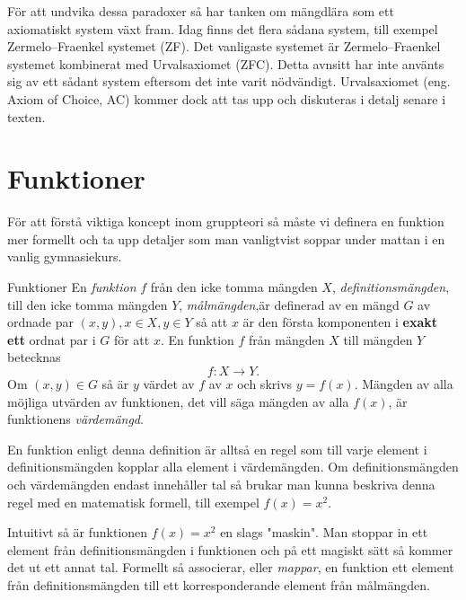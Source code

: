 \documentclass{article}
\theoremstyle{definition}
\begin{document}
För att undvika dessa paradoxer så har tanken om mängdlära som ett axiomatiskt system växt fram. 
Idag finns det flera sådana system, till exempel Zermelo–Fraenkel systemet (ZF). Det vanligaste 
systemet är Zermelo–Fraenkel systemet kombinerat med Urvalsaxiomet (ZFC). Detta avnsitt har inte använts sig 
av ett sådant system eftersom det inte varit nödvändigt. 
Urvalsaxiomet (eng. Axiom of Choice, AC) kommer dock att 
tas upp och diskuteras i detalj senare i texten.

\section{Funktioner}
För att förstå viktiga koncept inom gruppteori så måste vi definera en funktion mer formellt och ta upp detaljer som man vanligtvist soppar under mattan i en vanlig gymnasiekurs.

\begin{mydef}{Funktioner}{}
  En \textit{funktion} $f$ från den icke tomma mängden $X$, \textit{definitionsmängden}, till den icke tomma mängden $Y$, \textit{målmängden},är definerad 
  av en mängd $G$ av ordnade par $(x, y), x \in X, y \in Y$ så att $x$ är den första komponenten i \textbf{exakt ett} ordnat par i $G$ för att $x$. En funktion $f$ från mängden $X$
  till mängden $Y$ betecknas
  \[f: X \rightarrow Y.\]
  Om $(x, y) \in G$ så är $y$ värdet av $f$ av $x$ och skrivs $y=f(x)$. Mängden av alla möjliga utvärden av funktionen, det vill säga mängden av alla $f(x)$, är funktionens \textit{värdemängd}.
\end{mydef}

En funktion enligt denna definition är alltså en regel som till varje element i definitionsmängden kopplar alla element i värdemängden. Om definitionsmängden och värdemängden endast innehåller
tal så brukar man kunna beskriva denna regel med en matematisk formell, till exempel $f(x) = x^2$.

Intuitivt så är funktionen $f(x) = x^2$ en slags "maskin". Man stoppar in ett element från definitionsmängden i funktionen och på ett magiskt sätt 
så kommer det ut ett annat tal. Formellt så associerar,
eller \textit{mappar}, en funktion ett element från definitionsmängden till ett korresponderande element från målmängden.


\begin{center}
\end{center}
\end{document}
